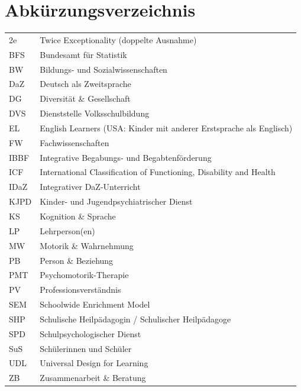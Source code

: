 \documentclass[ngerman, a4paper]{article}
\begin{document}
\section*{Abkürzungsverzeichnis}

\begin{tabular}{@{}ll@{}}
2e    & Twice Exceptionality (doppelte Ausnahme) \\
BFS   & Bundesamt für Statistik \\
BW    & Bildungs- und Sozialwissenschaften \\
DaZ   & Deutsch als Zweitsprache \\
DG    & Diversität \& Gesellschaft \\
DVS   & Dienststelle Volksschulbildung \\
EL    & English Learners (USA: Kinder mit anderer Erstsprache als Englisch) \\
FW    & Fachwissenschaften \\
IBBF  & Integrative Begabungs- und Begabtenförderung \\
ICF   & International Classification of Functioning, Disability and Health \\
IDaZ  & Integrativer DaZ-Unterricht \\
KJPD  & Kinder- und Jugendpsychiatrischer Dienst \\
KS    & Kognition \& Sprache \\
LP    & Lehrperson(en) \\
MW    & Motorik \& Wahrnehmung \\
PB    & Person \& Beziehung \\
PMT   & Psychomotorik-Therapie \\
PV    & Professionsverständnis \\
SEM   & Schoolwide Enrichment Model \\
SHP   & Schulische Heilpädagogin / Schulischer Heilpädagoge \\
SPD   & Schulpsychologischer Dienst \\
SuS   & Schülerinnen und Schüler \\
UDL   & Universal Design for Learning \\
ZB    & Zusammenarbeit \& Beratung \\
\end{tabular}


\end{document}
